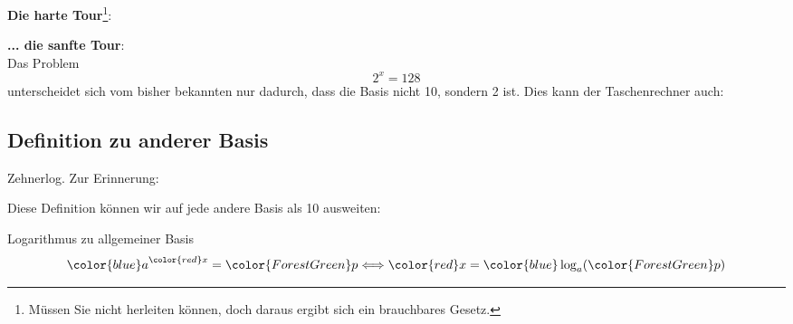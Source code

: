 \textbf{Die harte Tour}\label{harteTourLogarithmen}\footnote{Müssen Sie nicht herleiten können,
  doch daraus ergibt sich ein brauchbares Gesetz.}:\\


  \textbf{... die sanfte Tour}:\\

 Das Problem $$2^x=128$$ unterscheidet sich vom bisher bekannten nur
 dadurch, dass die Basis nicht 10, sondern 2 ist. Dies kann der
 Taschenrechner auch: 



\subsection{Definition zu anderer Basis}
 
\begin{bemerkung}{Zehnerlog.}{}
  Zur Erinnerung:
  \noTRAINER{\vspace{22mm}}
    
\end{bemerkung}

Diese Definition können wir auf jede andere Basis als 10 ausweiten:

 \begin{definition}{Logarithmus zu allgemeiner Basis}{}
   $${\color{blue}a}^{\color{red}x}={\color{ForestGreen}p} \Longleftrightarrow {\color{red}x} = {\color{blue} \log_a}({\color{ForestGreen}p})$$
   \end{definition}


